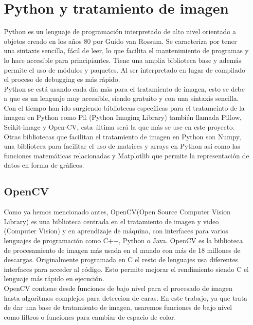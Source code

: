 \documentclass[a4paper,12pt]{report}
\begin{document}
\section{Python y tratamiento de imagen}

Python es un lenguaje de programación interpretado de alto nivel orientado a objetos creado en los años 80 por Guido van Rossum. Se caracteriza por tener una sintaxis sencilla, fácil de leer, lo que facilita el mantenimiento de programas y lo hace accesible para principiantes. Tiene una amplia biblioteca base y además permite el uso de módulos y paquetes. Al ser interpretado en lugar de compilado el proceso de debugging es más rápido.\\

 Python se está usando cada día más para el tratamiento de imagen, esto se debe a que es un lenguaje muy accesible, siendo gratuito y con una sintaxis sencilla. Con el tiempo han ido surgiendo bibliotecas específicas para el tratameinto de la imagen en Python como Pil (Python Imaging Library) también llamada Pillow, Scikit-image y Open-CV, esta última será la que más se use en este proyecto.\\

Otras bibliotecas que facilitan el tratamiento de imagen en Python son Numpy, una biblioteca para facilitar el uso de matrices y arrays en Python así como las funciones matemáticas relacionadas y Matplotlib que permite  la representación de datos en forma de gráficos.\\

\subsection{OpenCV}

Como ya hemos mencionado antes, OpenCV(Open Source Computer Vision Library) es una biblioteca centrada en el tratamiento de imagen y video (Computer Vision) y en aprendizaje de máquina, con interfaces para varios lenguajes de programación como C++, Python o Java. OpenCV es la biblioteca de procesamiento de imagen más usada en el mundo con más de 18 millones de descargas. Originalmente programada en C el resto de lenguajes usa diferentes interfaces para acceder al código. Esto permite mejorar el rendimiento siendo C el lenguaje más rápido en ejecución.\\

OpenCV contiene  desde funciones de bajo nivel para el procesado de imagen hasta algoritmos complejos para deteccion de caras. En este trabajo, ya que trata de dar una base de tratamiento de imagen, usaremos funciones de bajo nivel como filtros o funciones para cambiar de espacio de color.\\
\end{document}
